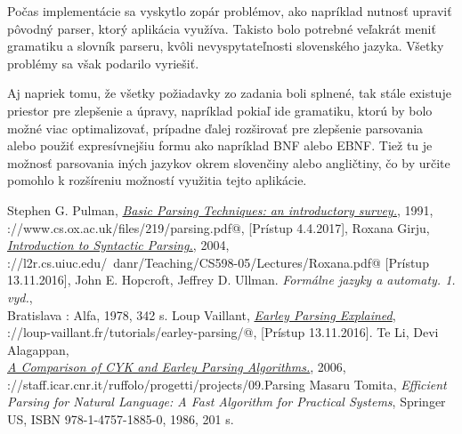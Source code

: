\documentclass[12pt,a4paper]{report}
\theoremstyle{definition}
\theoremstyle{remark}
\begin{document}
Počas implementácie sa vyskytlo zopár problémov, ako napríklad nutnosť upraviť pôvodný parser, ktorý aplikácia využíva. Takisto bolo potrebné veľakrát meniť gramatiku a slovník parseru, kvôli nevyspytateľnosti slovenského jazyka. Všetky problémy sa však podarilo vyriešiť.

Aj napriek tomu, že všetky požiadavky zo zadania boli splnené, tak stále existuje priestor pre zlepšenie a úpravy, napríklad pokiaľ ide gramatiku, ktorú by bolo možné viac optimalizovať, prípadne ďalej rozširovať pre zlepšenie parsovania alebo použiť expresívnejšiu formu ako napríklad BNF alebo EBNF. Tiež tu je možnosť parsovania iných jazykov okrem slovenčiny alebo angličtiny, čo by určite pomohlo k rozšíreniu možností využitia tejto aplikácie. 

\renewcommand\bibname{Literatúra}
\begin{thebibliography}{99}
Stephen G. Pulman, \emph{\href{https://www.cs.ox.ac.uk/files/219/parsing.pdf}{Basic Parsing Techniques: an introductory survey.}}, 1991, \\ \verb@https://www.cs.ox.ac.uk/files/219/parsing.pdf@, [Prístup 4.4.2017],
Roxana Girju, \emph{\href{http://l2r.cs.uiuc.edu/~danr/Teaching/CS598-05/Lectures/Roxana.pdf}{Introduction to Syntactic Parsing.}}, 2004, \\ \verb@http://l2r.cs.uiuc.edu/~danr/Teaching/CS598-05/Lectures/Roxana.pdf@ [Prístup 13.11.2016],
John E. Hopcroft, Jeffrey D. Ullman. \emph{Formálne jazyky a automaty. 1. vyd.}, \\ Bratislava : Alfa, 1978, 342 s.
Loup Vaillant, \emph{\href{http://loup-vaillant.fr/tutorials/earley-parsing/}{Earley Parsing Explained}}, \\ \verb@http://loup-vaillant.fr/tutorials/earley-parsing/@, [Prístup 13.11.2016].
Te Li, Devi Alagappan, \\
\emph{\href{http://staff.icar.cnr.it/ruffolo/progetti/projects/09.Parsing\%20CYK/A\%20Comparison\%20of\%20CYK\%20and\%20Earley\%20Parsing\%20Algorithms-cykeReport.pdf}{A Comparison of CYK and Earley Parsing Algorithms.}}, 2006, \\ \verb@http://staff.icar.cnr.it/ruffolo/progetti/projects/09.Parsing\@
\verb@%20CYK/A\%20Comparison\%20of\%20CYK\%20and\%20Earley\%20Parsing\@
\verb@%20Algorithms-cykeReport.pdf@ [Prístup 18.11.2016],
Masaru Tomita, \emph{Efficient Parsing for Natural Language: A Fast Algorithm for Practical Systems}, Springer US, ISBN 978-1-4757-1885-0, 1986, 201 s.


\end{thebibliography}
\end{document}
